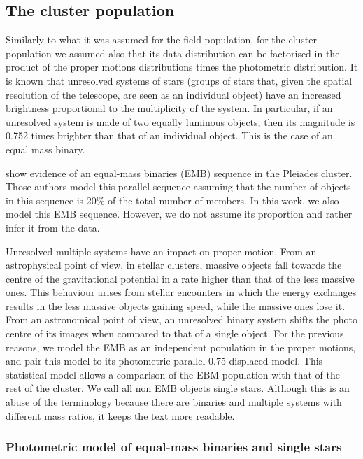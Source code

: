 
\subsection{The cluster population}
\label{subsect:cluster}
Similarly to what it was assumed for the field population, for the cluster population we assumed also that its data distribution can be factorised in the product of the proper motions distributions times the photometric distribution. It is known that unresolved systems of stars (groups of stars that, given the spatial resolution of the telescope, are seen as an individual object) have an increased brightness proportional to the multiplicity of the system. In particular, if an unresolved system is made of two equally luminous objects, then its magnitude is 0.752 times brighter than that of an individual object. This is the case of an equal mass binary.

\citet{Sarro2014} show evidence of an equal-mass binaries (EMB) sequence in the Pleiades cluster. Those authors model this parallel sequence assuming that the number of objects in this sequence is 20\% of the total number of members. In this work, we also model this EMB sequence. However, we do not assume its proportion and rather infer it from the data. 

Unresolved multiple systems have an impact on proper motion. From an astrophysical point of view, in stellar clusters, massive objects fall towards the centre of the gravitational potential in a rate higher than that of the less massive ones. This behaviour arises from stellar encounters in which the energy exchanges results in the less massive objects gaining speed, while the massive ones lose it. From an astronomical point of view, an unresolved binary system shifts the photo centre of its images when compared to that of a single object. For the previous reasons, we model the EMB as an independent population in the proper motions, and pair this model to its photometric parallel 0.75 displaced model. This statistical model allows a comparison of the EBM population with that of the rest of the cluster. We call all non EMB objects single stars. Although this is an abuse of the terminology because there are binaries and multiple systems with different mass ratios, it keeps the text more readable.

\subsubsection{Photometric model of equal-mass binaries and single stars}

